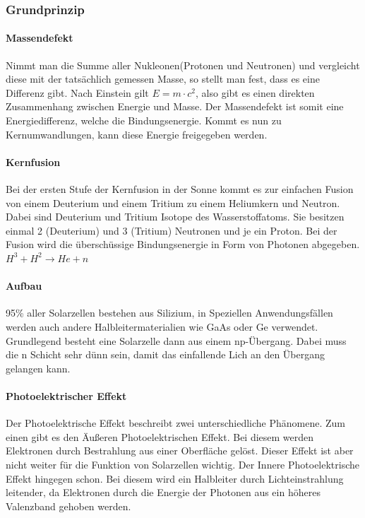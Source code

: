 	\subsubsection{Grundprinzip}
	
		\paragraph{Massendefekt}
		Nimmt man die Summe aller Nukleonen(Protonen und Neutronen) und vergleicht diese mit der tatsächlich gemessen Masse, so stellt man fest, dass es eine Differenz gibt. Nach Einstein gilt  $E = m\cdot c^2$, also gibt es einen direkten Zusammenhang zwischen Energie und Masse. Der Massendefekt ist somit eine Energiedifferenz, welche die Bindungsenergie. Kommt es nun zu Kernumwandlungen, kann diese Energie freigegeben werden.
		
		\paragraph{Kernfusion}
		Bei der ersten Stufe der Kernfusion in der Sonne kommt es zur einfachen Fusion von einem Deuterium und einem Tritium zu einem Heliumkern und Neutron. Dabei sind Deuterium und Tritium Isotope des Wasserstoffatoms. Sie besitzen einmal 2 (Deuterium) und 3 (Tritium) Neutronen und je ein Proton. Bei der Fusion wird die überschüssige Bindungsenergie in Form von Photonen abgegeben.
		$H^3 + H^2 \rightarrow He + n$
		
		\paragraph{Aufbau}
		95\% aller Solarzellen bestehen aus Silizium, in Speziellen Anwendungsfällen werden auch andere Halbleitermaterialien wie GaAs oder Ge verwendet. Grundlegend besteht eine Solarzelle dann aus einem np-Übergang. Dabei muss die n Schicht sehr dünn sein, damit das einfallende Lich an den Übergang gelangen kann.
		
		\paragraph{Photoelektrischer Effekt}
		Der Photoelektrische Effekt beschreibt zwei unterschiedliche Phänomene. Zum einen gibt es den Äußeren Photoelektrischen Effekt. Bei diesem werden Elektronen durch Bestrahlung aus einer Oberfläche gelöst. Dieser Effekt ist aber nicht weiter für die Funktion von Solarzellen wichtig. Der Innere Photoelektrische Effekt hingegen schon. Bei diesem wird ein Halbleiter durch Lichteinstrahlung leitender, da Elektronen durch die Energie der Photonen aus ein höheres Valenzband gehoben werden.
		
